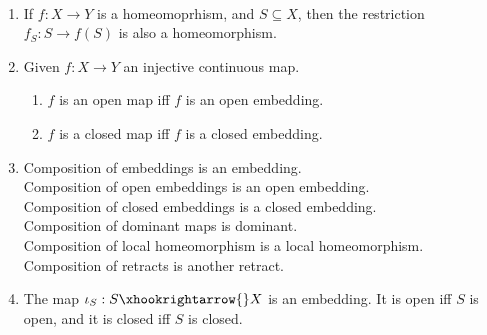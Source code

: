 \documentclass{treatise}
\begin{document}
\begin{proposition} \ 
\begin{enumerate}
    \item If $f: X \to Y$ is a homeomoprhism, and $S \subseteq X$, then the restriction $f_S : S \to f(S)$ is also a homeomorphism.
    \item Given $f: X \to Y$ an injective continuous map.
    \begin{enumerate}
        \item $f$ is an open map iff $f$ is an open embedding.
        \item $f$ is a closed map iff $f$ is a closed embedding.
    \end{enumerate}
    \item Composition of embeddings is an embedding.
    \\
    Composition of open embeddings is an open embedding.
    \\
    Composition of closed embeddings is a closed embedding.
    \\
    Composition of dominant maps is dominant.
    \\
    Composition of local homeomorphism is a local homeomorphism.
    \\
    Composition of retracts is another retract.
    \item The map $\iota_S: S \xhookrightarrow{} X$ is an embedding. It is open iff $S$ is open, and it is closed iff $S$ is closed.
\end{enumerate}
\end{proposition}
\end{document}
